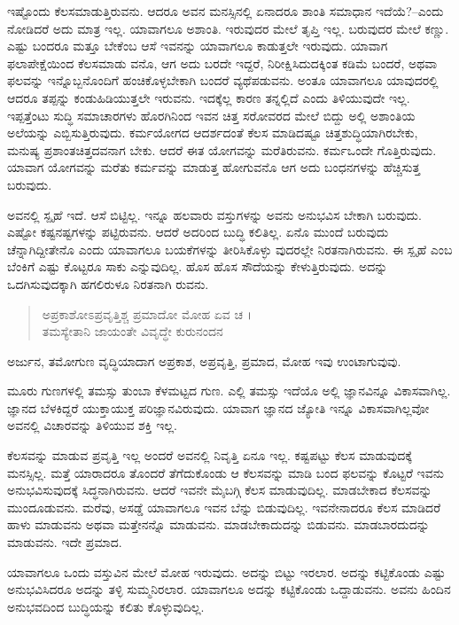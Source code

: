ಇಷ್ಟೊಂದು ಕೆಲಸಮಾಡುತ್ತಿರುವನು. ಆದರೂ ಅವನ ಮನಸ್ಸಿನಲ್ಲಿ ಏನಾದರೂ ಶಾಂತಿ ಸಮಾಧಾನ ಇದೆಯೆ?--ಎಂದು ನೋಡಿದರೆ ಅದು ಮಾತ್ರ ಇಲ್ಲ. ಯಾವಾಗಲೂ ಅಶಾಂತಿ. ಇರುವುದರ ಮೇಲೆ ತೃಪ್ತಿ ಇಲ್ಲ. ಬರುವುದರ ಮೇಲೆ ಕಣ್ಣು. ಎಷ್ಟು ಬಂದರೂ ಮತ್ತೂ ಬೇಕೆಂಬ ಆಸೆ ಇವನನ್ನು ಯಾವಾಗಲೂ ಕಾಡುತ್ತಲೇ ಇರುವುದು. ಯಾವಾಗ ಫಲಾಪೇಕ್ಷೆಯಿಂದ ಕೆಲಸಮಾಡು ವನೊ, ಆಗ ಅದು ಬರದೇ ಇದ್ದರೆ, ನಿರೀಕ್ಷಿಸಿದುದಕ್ಕಿಂತ ಕಡಿಮೆ ಬಂದರೆ, ಅಥವಾ ಫಲವನ್ನು ಇನ್ನೊಬ್ಬನೊಂದಿಗೆ ಹಂಚಿಕೊಳ್ಳಬೇಕಾಗಿ ಬಂದರೆ ವ್ಯಥೆಪಡುವನು. ಅಂತೂ ಯಾವಾಗಲೂ ಯಾವುದರಲ್ಲಿ ಆದರೂ ತಪ್ಪನ್ನು ಕಂಡುಹಿಡಿಯುತ್ತಲೇ ಇರುವನು. ಇದಕ್ಕೆಲ್ಲ ಕಾರಣ ತನ್ನಲ್ಲಿದೆ ಎಂದು ತಿಳಿಯುವುದೇ ಇಲ್ಲ. ಇಪ್ಪತ್ತೆಂಟು ಸುದ್ಧಿ ಸಮಾಚಾರಗಳು ಹೊರಗಿನಿಂದ ಇವನ ಚಿತ್ತ ಸರೋವರದ ಮೇಲೆ ಬಿದ್ದು ಅಲ್ಲಿ ಅಶಾಂತಿಯ ಅಲೆಯನ್ನು ಎಬ್ಬಿಸುತ್ತಿರುವುದು. ಕರ್ಮಯೋಗದ ಆದರ್ಶದಂತೆ ಕೆಲಸ ಮಾಡಿದಷ್ಟೂ ಚಿತ್ತಶುದ್ಧಿಯಾಗಿರಬೇಕು, ಮನುಷ್ಯ ಪ್ರಶಾಂತಚಿತ್ತದವನಾಗ ಬೇಕು. ಆದರೆ ಈತ ಯೋಗವನ್ನು ಮರೆತಿರುವನು. ಕರ್ಮಒಂದೇ ಗೊತ್ತಿರುವುದು. ಯಾವಾಗ ಯೋಗವನ್ನು ಮರೆತು ಕರ್ಮವನ್ನು ಮಾಡುತ್ತ ಹೋಗುವನೊ ಆಗ ಅದು ಬಂಧನಗಳನ್ನು ಹೆಚ್ಚಿಸುತ್ತ ಬರುವುದು.

ಅವನಲ್ಲಿ ಸ್ಪೃಹೆ ಇದೆ. ಆಸೆ ಬಿಟ್ಟಿಲ್ಲ. ಇನ್ನೂ ಹಲವಾರು ವಸ್ತುಗಳನ್ನು ಅವನು ಅನುಭವಿಸ ಬೇಕಾಗಿ ಬರುವುದು. ಎಷ್ಟೋ ಕಷ್ಟನಷ್ಟಗಳನ್ನು ಪಟ್ಟಿರುವನು. ಆದರೆ ಅದರಿಂದ ಬುದ್ಧಿ ಕಲಿತಿಲ್ಲ. ಏನೊ ಮುಂದೆ ಬರುವುದು ಚೆನ್ನಾಗಿದ್ದೀತೇನೊ ಎಂದು ಯಾವಾಗಲೂ ಬಯಕೆಗಳನ್ನು ತೀರಿಸಿಕೊಳ್ಳು ವುದರಲ್ಲೇ ನಿರತನಾಗಿರುವನು. ಈ ಸ್ಪೃಹೆ ಎಂಬ ಬೆಂಕಿಗೆ ಎಷ್ಟು ಕೊಟ್ಟರೂ ಸಾಕು ಎನ್ನುವುದಿಲ್ಲ. ಹೊಸ ಹೊಸ ಸೌದೆಯನ್ನು ಕೇಳುತ್ತಿರುವುದು. ಅದನ್ನು ಒದಗಿಸುವುದಕ್ಕಾಗಿ ಹಗಲಿರುಳೂ ನಿರತನಾಗಿ ರುವನು.

\begin{verse}
ಅಪ್ರಕಾಶೋಽಪ್ರವೃತ್ತಿಶ್ಚ ಪ್ರಮಾದೋ ಮೋಹ ಏವ ಚ ।\\ತಮಸ್ಯೇತಾನಿ ಜಾಯಂತೇ ವಿವೃದ್ಧೇ ಕುರುನಂದನ 
\end{verse}

{\small ಅರ್ಜುನ, ತಮೋಗುಣ ವೃದ್ಧಿಯಾದಾಗ ಅಪ್ರಕಾಶ, ಅಪ್ರವೃತ್ತಿ, ಪ್ರಮಾದ, ಮೋಹ ಇವು ಉಂಟಾಗುವುವು.}

ಮೂರು ಗುಣಗಳಲ್ಲಿ ತಮಸ್ಸು ತುಂಬಾ ಕೆಳಮಟ್ಟದ ಗುಣ. ಎಲ್ಲಿ ತಮಸ್ಸು ಇದೆಯೊ ಅಲ್ಲಿ ಜ್ಞಾನವಿನ್ನೂ ವಿಕಾಸವಾಗಿಲ್ಲ. ಜ್ಞಾನದ ಬೆಳಕಿದ್ದರೆ ಯುಕ್ತಾಯುಕ್ತ ಪರಿಜ್ಞಾನವಿರುವುದು. ಯಾವಾಗ ಜ್ಞಾನದ ಜ್ಯೋತಿ ಇನ್ನೂ ವಿಕಾಸವಾಗಿಲ್ಲವೋ ಅವನಲ್ಲಿ ವಿಚಾರವನ್ನು ತಿಳಿಯುವ ಶಕ್ತಿ ಇಲ್ಲ.

ಕೆಲಸವನ್ನು ಮಾಡುವ ಪ್ರವೃತ್ತಿ ಇಲ್ಲ ಅಂದರೆ ಅವನಲ್ಲಿ ನಿವೃತ್ತಿ ಏನೂ ಇಲ್ಲ. ಕಷ್ಟಪಟ್ಟು ಕೆಲಸ ಮಾಡುವುದಕ್ಕೆ ಮನಸ್ಸಿಲ್ಲ. ಮತ್ತೆ ಯಾರಾದರೂ ತೊಂದರೆ ತೆಗೆದುಕೊಂಡು ಆ ಕೆಲಸವನ್ನು ಮಾಡಿ ಬಂದ ಫಲವನ್ನು ಕೊಟ್ಟರೆ ಇವನು ಅನುಭವಿಸುವುದಕ್ಕೆ ಸಿದ್ಧನಾಗಿರುವನು. ಆದರೆ ಇವನೇ ಮೈಬಗ್ಗಿ ಕೆಲಸ ಮಾಡುವುದಿಲ್ಲ. ಮಾಡಬೇಕಾದ ಕೆಲಸವನ್ನು ಮುಂದೂಡುವನು. ಮರೆವು, ಅಸಡ್ಡೆ ಯಾವಾಗಲೂ ಇವನ ಬೆನ್ನು ಬಿಡುವುದಿಲ್ಲ. ಇವನೇನಾದರೂ ಕೆಲಸ ಮಾಡಿದರೆ ಹಾಳು ಮಾಡುವನು ಅಥವಾ ಮತ್ತೇನನ್ನೊ ಮಾಡುವನು. ಮಾಡಬೇಕಾದುದನ್ನು ಬಿಡುವನು. ಮಾಡಬಾರದುದನ್ನು ಮಾಡುವನು. ಇದೇ ಪ್ರಮಾದ.

ಯಾವಾಗಲೂ ಒಂದು ವಸ್ತುವಿನ ಮೇಲೆ ಮೋಹ ಇರುವುದು. ಅದನ್ನು ಬಿಟ್ಟು ಇರಲಾರ. ಅದನ್ನು ಕಟ್ಟಿಕೊಂಡು ಎಷ್ಟು ಅನುಭವಿಸಿದರೂ ಅದನ್ನು ತಳ್ಳಿ ಸುಮ್ಮನಿರಲಾರ. ಯಾವಾಗಲೂ ಅದನ್ನು ಕಟ್ಟಿಕೊಂಡು ಒದ್ದಾಡುವನು. ಅವನು ಹಿಂದಿನ ಅನುಭವದಿಂದ ಬುದ್ಧಿಯನ್ನು ಕಲಿತು ಕೊಳ್ಳುವುದಿಲ್ಲ.

